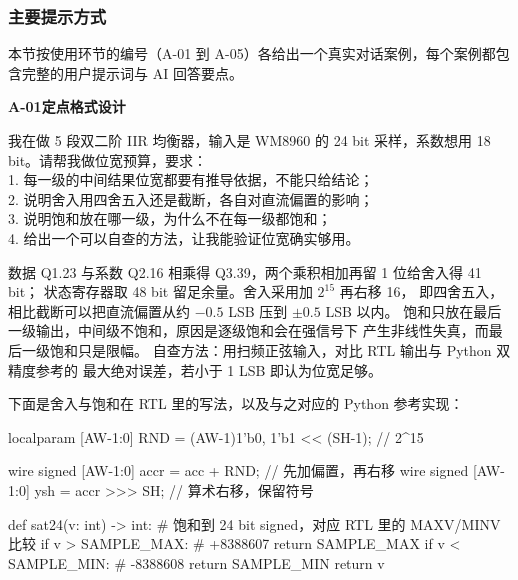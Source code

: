 \documentclass[withoutpreface,bwprint]{cumcmthesis}
\newcommand{\aichat}[2]{%
  \par\vspace{1.0em}%
  \noindent\textbf{\zihao{-4}#1\quad #2}\par
  \vspace{0.6em}%
}
\begin{document}
\subsubsection{主要提示方式}

本节按使用环节的编号（A-01 到 A-05）各给出一个真实对话案例，每个案例都包含完整的用户提示词与 AI 回答要点。

\aichat{A-01}{定点格式设计}

\begin{tcolorbox}[title=\textbf{用户提示词}, colback=blue!2!white,
                  colframe=blue!30!black, fonttitle=\bfseries, breakable]
我在做 5 段双二阶 IIR 均衡器，输入是 WM8960 的 24 bit 采样，系数想用 18 bit。请帮我做位宽预算，要求：\\
1. 每一级的中间结果位宽都要有推导依据，不能只给结论；\\
2. 说明舍入用四舍五入还是截断，各自对直流偏置的影响；\\
3. 说明饱和放在哪一级，为什么不在每一级都饱和；\\
4. 给出一个可以自查的方法，让我能验证位宽确实够用。
\end{tcolorbox}

\begin{tcolorbox}[title=\textbf{AI 回答要点}, colback=green!2!white,
                  colframe=green!30!black, fonttitle=\bfseries, breakable]
数据 Q1.23 与系数 Q2.16 相乘得 Q3.39，两个乘积相加再留 1 位给舍入得 41 bit；
状态寄存器取 48 bit 留足余量。舍入采用加 $2^{15}$ 再右移 16，
即四舍五入，相比截断可以把直流偏置从约 $-0.5$ LSB 压到 $\pm 0.5$ LSB 以内。
饱和只放在最后一级输出，中间级不饱和，原因是逐级饱和会在强信号下
产生非线性失真，而最后一级饱和只是限幅。
自查方法：用扫频正弦输入，对比 RTL 输出与 Python 双精度参考的
最大绝对误差，若小于 1 LSB 即认为位宽足够。

下面是舍入与饱和在 RTL 里的写法，以及与之对应的 Python 参考实现：

\begin{ai_verilog}
localparam [AW-1:0] RND = {{(AW-1){1'b0}}, 1'b1} << (SH-1);  // 2^15

wire signed [AW-1:0] accr = acc + RND;      // 先加偏置，再右移
wire signed [AW-1:0] ysh  = accr >>> SH;    // 算术右移，保留符号
\end{ai_verilog}

\begin{ai_python}
def sat24(v: int) -> int:
    # 饱和到 24 bit signed，对应 RTL 里的 MAXV/MINV 比较
    if v > SAMPLE_MAX:      # +8388607
        return SAMPLE_MAX
    if v < SAMPLE_MIN:      # -8388608
        return SAMPLE_MIN
    return v
\end{ai_python}
\end{tcolorbox}
\end{document}
